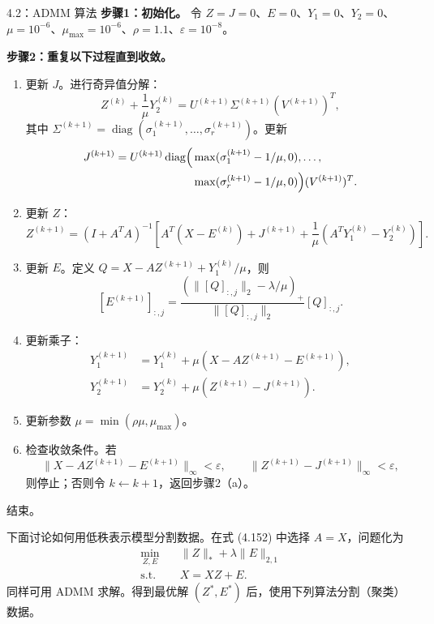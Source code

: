 \begin{bookalgorithm}{4.2：ADMM 算法}
\noindent\textbf{步骤1：初始化。}
令 $Z=J=0$、$E=0$、$Y_1=0$、$Y_2=0$、$\mu=10^{-6}$、$\mu_{\max}=10^{-6}$、$\rho=1.1$、$\varepsilon=10^{-8}$。

\noindent\textbf{步骤2：重复以下过程直到收敛。}
\begin{enumerate}[label=\alph*.,leftmargin=2em]
\item 更新 $J$。进行奇异值分解：
\[
Z^{(k)}+\frac1\mu Y_2^{(k)}=U^{(k+1)}\Sigma^{(k+1)}(V^{(k+1)})^T,
\]
其中 $\Sigma^{(k+1)}=\operatorname{diag}(\sigma_1^{(k+1)},\ldots,\sigma_r^{(k+1)})$。更新
\[
\begin{aligned}
J^{(k+1)}=U^{(k+1)}\operatorname{diag}\Bigl(
&\max(\sigma_1^{(k+1)}-1/\mu,0),\ldots,\\
&\max(\sigma_r^{(k+1)}-1/\mu,0)\Bigr)(V^{(k+1)})^T.
\end{aligned}
\]
\item 更新 $Z$：
\[
Z^{(k+1)}=(I+A^TA)^{-1}\left[A^T(X-E^{(k)})+J^{(k+1)}
+\frac1\mu(A^TY_1^{(k)}-Y_2^{(k)})\right].
\]
\item 更新 $E$。定义 $Q=X-AZ^{(k+1)}+Y_1^{(k)}/\mu$，则
\[
[E^{(k+1)}]_{:,j}
=\frac{(\lVert[Q]_{:,j}\rVert_2-\lambda/\mu)_+}{\lVert[Q]_{:,j}\rVert_2}[Q]_{:,j}.
\]
\item 更新乘子：
\[
\begin{aligned}
Y_1^{(k+1)}&=Y_1^{(k)}+\mu(X-AZ^{(k+1)}-E^{(k+1)}),\\
Y_2^{(k+1)}&=Y_2^{(k)}+\mu(Z^{(k+1)}-J^{(k+1)}).
\end{aligned}
\]
\item 更新参数 $\mu=\min(\rho\mu,\mu_{\max})$。
\item 检查收敛条件。若
\[
\lVert X-AZ^{(k+1)}-E^{(k+1)}\rVert_\infty<\varepsilon,\qquad
\lVert Z^{(k+1)}-J^{(k+1)}\rVert_\infty<\varepsilon,
\]
则停止；否则令 $k\leftarrow k+1$，返回步骤2（a）。
\end{enumerate}
\noindent 结束。
\end{bookalgorithm}

下面讨论如何用低秩表示模型分割数据。在式 (4.152) 中选择 $A=X$，问题化为
\begin{equation}
\begin{aligned}
\min_{Z,E}\quad&\lVert Z\rVert_*+\lambda\lVert E\rVert_{2,1}\\
\text{s.t.}\quad&X=XZ+E.
\end{aligned}
\tag{4.155}
\end{equation}
同样可用 ADMM 求解。得到最优解 $(Z^*,E^*)$ 后，使用下列算法分割（聚类）数据。

